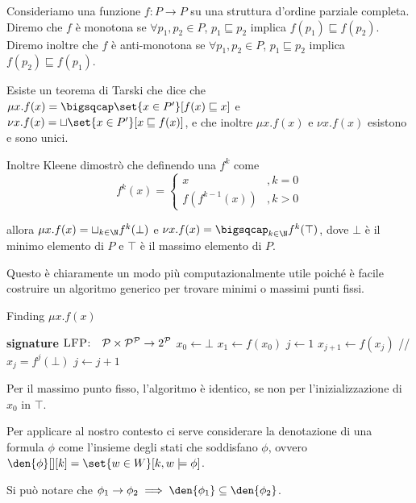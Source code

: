 Consideriamo una funzione \(f: P \to P\) su una struttura d'ordine parziale completa. Diremo che \(f\) è monotona se \(\forall p_1, p_2 \in P\), \(p_1 \sqsubseteq  p_2\) implica \(f(p_1) \sqsubseteq  f(p_2)\). Diremo inoltre che \(f\) è anti-monotona se \(\forall p_1, p_2 \in P\), \(p_1 \sqsubseteq  p_2\) implica \(f(p_2) \sqsubseteq  f(p_1)\). 

Esiste un teorema di Tarski che dice che \(\mu x . f(x) = \bigsqcap \set{x\in P'}[f(x) \sqsubseteq  x]\) e \(\nu x . f(x) = \sqcup \set{x\in P'}[x \sqsubseteq  f(x)]\), e che inoltre \(\mu x . f(x)\) e \(\nu x. f(x)\) esistono e sono unici.

Inoltre Kleene dimostrò che definendo una \(f^k\) come
\[f^k(x) = \begin{cases}
x & ,k = 0 \\
f(f^{k-1}(x)) & ,k > 0
\end{cases}\]

allora \(\mu x . f(x) = \sqcup_{k\in\N} f^k(\bot)\) e \(\nu x . f(x) = \bigsqcap_{k\in\N} f^k(\top)\), dove \(\bot\) è il minimo elemento di \(P\) e \(\top\) è il massimo elemento di \(P\).

Questo è chiaramente un modo più computazionalmente utile poiché è facile costruire un algoritmo generico per trovare minimi o massimi punti fissi.

\begin{algorithmdesc}{Finding \(\mu x. f(x)\)}
  \begin{algorithmic}[1]
    \Statex{} \textbf{signature} \(\textsc{LFP:} \quad \mathcal{P} \times \mathcal{P}^{\mathcal{P}} \to 2^\mathcal{P} \)
      \State{} \(x_0 \gets \bot\)
      \State{} \(x_1 \gets f(x_0)\)
      \State{} \(j \gets 1\)
        \State{} \(x_{j+1} \gets f(x_j)\) // \(x_j = f^j(\bot)\)
        \State{} \(j \gets j + 1\)
      \EndWhile{}
    \EndFunction{}
  \end{algorithmic}
\end{algorithmdesc}

Per il massimo punto fisso, l'algoritmo è identico, se non per l'inizializzazione di \(x_0\) in \(\top\).

Per applicare al nostro contesto ci serve considerare la denotazione di una formula \(\phi\) come l'insieme degli stati che soddisfano \(\phi\), ovvero \(\den{\phi}[][k] = \set{w \in W}[k,w\models \phi]\).

Si può notare che \(\phi_1 \to \phi_2 \implies \den{\phi_1} \subseteq \den{\phi_2}\).

